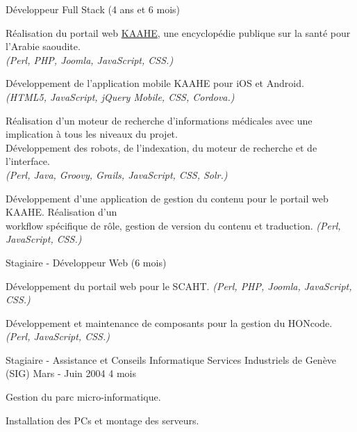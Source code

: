 \begin{cventries}
  \cventry
    {Développeur Full Stack (4 ans et 6 mois)}
    {}
    {}
    {}
    {
      \begin{cvitems}
        \item Réalisation du portail web
          {\color{awesome-skyblue}\href{https://kaahe.org/}{KAAHE}}, une
          encyclopédie publique sur la santé pour l'Arabie saoudite.\\
          \textit{(Perl, PHP, Joomla, JavaScript, CSS.)}
        \item Développement de l'application mobile KAAHE pour iOS et Android.\\
          \textit{(HTML5, JavaScript, jQuery Mobile, CSS, Cordova.)}
        \item Réalisation d'un moteur de recherche d'informations médicales
          avec une implication à tous les niveaux du projet.\\
          Développement des robots, de l'indexation, du moteur de recherche
          et de l'interface.\\
          \textit{(Perl, Java, Groovy, Grails, JavaScript, CSS, Solr.)}
        \item Développement d'une application de gestion du contenu pour le
          portail web KAAHE. Réalisation d'un \\workflow spécifique de rôle,
          gestion de version du contenu et traduction.
          \textit{(Perl, JavaScript, CSS.)}
      \end{cvitems}
    }

  \cventry
    {Stagiaire - Développeur Web (6 mois)}
    {}
    {}
    {}
    {
      \begin{cvitems}
        \item Développement du portail web pour le SCAHT.
          \textit{(Perl, PHP, Joomla, JavaScript, CSS.)}
        \item Développement et maintenance de composants pour la gestion du
          HONcode. \textit{(Perl, JavaScript, CSS.)}
      \end{cvitems}
    }

  \cventry
    {Stagiaire - Assistance et Conseils Informatique}
    {Services Industriels de Genève (SIG)}
    {Mars - Juin 2004}
    {4 mois}
    {
      \begin{cvitems}
        \item Gestion du parc micro-informatique.
        \item Installation des PCs et montage des serveurs.
      \end{cvitems}
    }

\end{cventries}
